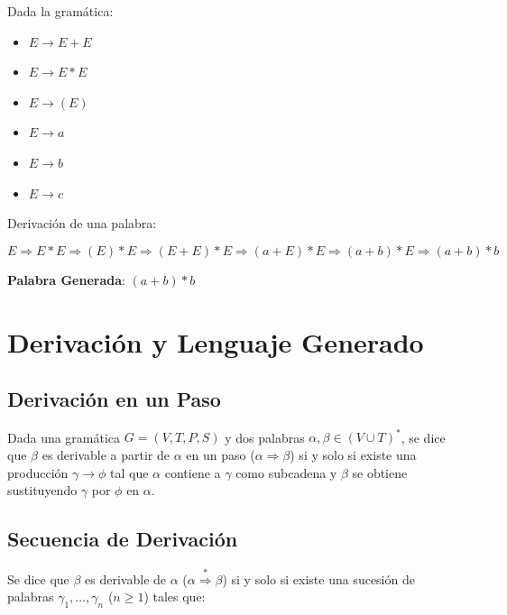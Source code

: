 \documentclass[12pt]{report} %
\begin{document}
\begin{ejemplo}
    Dada la gramática:

    \begin{itemize}
        \item $E \to E + E$
        \item $E \to E * E$
        \item $E \to (E)$
        \item $E \to a$
        \item $E \to b$
        \item $E \to c$
    \end{itemize}

    Derivación de una palabra:

    $$
    E \Rightarrow E * E \Rightarrow (E) * E \Rightarrow (E + E) * E \Rightarrow (a + E) * E \Rightarrow (a + b) * E \Rightarrow (a + b) * b
    $$

    \textbf{Palabra Generada}: $(a + b) * b$
\end{ejemplo}

\hypertarget{derivaciuxf3n-y-lenguaje-generado}{%
\section{Derivación y Lenguaje
Generado}\label{derivaciuxf3n-y-lenguaje-generado}}

\hypertarget{derivaciuxf3n-en-un-paso}{%
\subsection{Derivación en un Paso}\label{derivaciuxf3n-en-un-paso}}

Dada una gramática \(G = (V, T, P, S)\) y dos palabras
\(\alpha, \beta \in (V \cup T)^*\), se dice que \(\beta\) es derivable a
partir de \(\alpha\) en un paso (\(\alpha \Rightarrow \beta\)) si y solo
si existe una producción \(\gamma \to \phi\) tal que \(\alpha\) contiene
a \(\gamma\) como subcadena y \(\beta\) se obtiene sustituyendo
\(\gamma\) por \(\phi\) en \(\alpha\).

\hypertarget{secuencia-de-derivaciuxf3n}{%
\subsection{Secuencia de Derivación}\label{secuencia-de-derivaciuxf3n}}

Se dice que \(\beta\) es derivable de \(\alpha\)
(\(\alpha \overset{*}{\Rightarrow} \beta\)) si y solo si existe una
sucesión de palabras \(\gamma_1, \ldots, \gamma_n\) (\(n \geq 1\)) tales
que:
\end{document}
